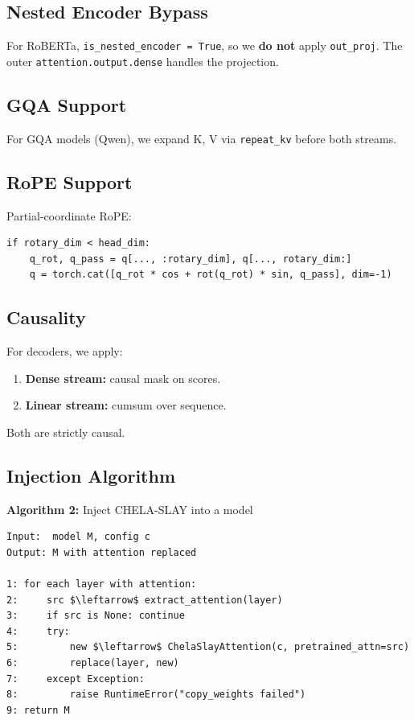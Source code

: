 \subsection{Nested Encoder Bypass}

For RoBERTa, \texttt{is\_nested\_encoder = True}, so we \textbf{do not} apply \texttt{out\_proj}. 
The outer \texttt{attention.output.dense} handles the projection.

\subsection{GQA Support}

For GQA models (Qwen), we expand K, V via \texttt{repeat\_kv} before both streams.

\subsection{RoPE Support}

Partial-coordinate RoPE:

\begin{lstlisting}
if rotary_dim < head_dim:
    q_rot, q_pass = q[..., :rotary_dim], q[..., rotary_dim:]
    q = torch.cat([q_rot * cos + rot(q_rot) * sin, q_pass], dim=-1)
\end{lstlisting}

\subsection{Causality}

For decoders, we apply:

\begin{enumerate}
\item \textbf{Dense stream:} causal mask on scores.
\item \textbf{Linear stream:} cumsum over sequence.

\end{enumerate}
Both are strictly causal.

\subsection{Injection Algorithm}

\textbf{Algorithm 2:} Inject CHELA-SLAY into a model
\begin{lstlisting}
Input:  model M, config c
Output: M with attention replaced

1: for each layer with attention:
2:     src $\leftarrow$ extract_attention(layer)
3:     if src is None: continue
4:     try:
5:         new $\leftarrow$ ChelaSlayAttention(c, pretrained_attn=src)
6:         replace(layer, new)
7:     except Exception:
8:         raise RuntimeError("copy_weights failed")
9: return M
\end{lstlisting}

